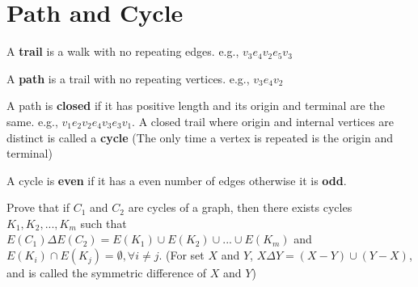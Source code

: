 		\section{Path and Cycle}
			\begin{definition}[trail]
				A \textbf{trail} is a walk with no repeating edges. e.g., $v_3e_4v_2e_5v_3$
			\end{definition}
			
			\begin{definition}[path]
				A \textbf{path} is a trail with no repeating vertices. e.g., $v_3e_4v_2$
			\end{definition}
			

			\begin{definition}
				A path is \textbf{closed} if it has positive length and its origin and terminal are the same. e.g., $v_1e_2v_2e_4v_3e_3v_1$. A closed trail where origin and internal vertices are distinct is called a \textbf{cycle} (The only time a vertex is repeated is the origin and terminal)
			\end{definition}
			
			\begin{definition}
				A cycle is \textbf{even} if it has a even number of edges otherwise it is \textbf{odd}.
			\end{definition}

			\begin{problem}
				Prove that if $C_1$ and $C_2$ are cycles of a graph, then there exists cycles $K_1, K_2, ..., K_m$ such that $E(C_1)\Delta E(C_2) = E(K_1)\cup E(K_2) \cup...\cup E(K_m)$ and $E(K_i)\cap E(K_j)=\emptyset, \forall i \neq j$. (For set $X$ and $Y$, $X\Delta Y = (X-Y)\cup(Y-X)$, and is called the symmetric difference of $X$ and $Y$)
			\end{problem}

